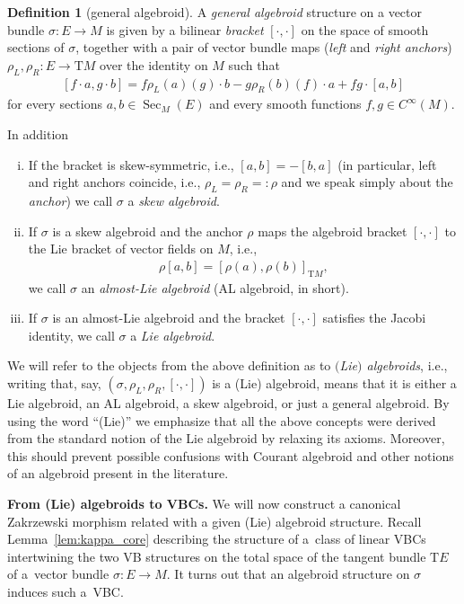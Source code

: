 \documentclass[10pt,a4paper]{amsart}
\newcommand{\ZM}{{VBC}} %
\newcommand{\Sec}{\operatorname{Sec}}
\newcommand{\ra}{\rightarrow}
\newcommand{\rhoL}{\rho_L} %
\newcommand{\rhoR}{\rho_R}
\newcommand{\T}{\mathrm{T}} %
\numberwithin{equation}{section}
\theoremstyle{definition}
\newtheorem{df}[thm]{Definition}
\begin{document}
\begin{df}[general algebroid]\label{def:algebroid}
A \emph{general algebroid} structure on a vector bundle \mbox{$\sigma\colon E\!\ra\! M$} is given by a bilinear \emph{bracket} $[\cdot,\cdot]$ on the space of smooth sections of $\sigma$, together with a pair of vector bundle maps (\emph{left} and \emph{right anchors}) $\rhoL,\rhoR\colon E\ra \T M$ over the identity on $M$ such that
\begin{gather}\label{eqn:bracket}
[f\cdot a,g\cdot b]=f\rhoL(a)(g)\cdot b-g\rhoR(b)(f)\cdot a+fg\cdot[a,b]
\end{gather}
for every sections $a,b\in\Sec_M(E)$ and every smooth functions $f,g\in C^\infty(M)$.

In addition
\begin{enumerate}[(i)]\itemsep=0pt
\item\label{cond:skew} If the bracket is skew-symmetric, i.e., $[a,b]=-[b,a]$ (in particular, left and right anchors coincide, i.e., $\rhoL=\rhoR=:\rho$ and we speak simply about the \emph{anchor}) we call $\sigma$ a \emph{skew algebroid}.
\item\label{cond:al} If $\sigma$ is a skew algebroid and the anchor $\rho$ maps the algebroid bracket $[\cdot,\cdot]$ to the Lie bracket of vector fields on $M$, i.e.,
\begin{gather}
\label{eqn:al_algebroid}
\rho[a,b]=[\rho(a),\rho(b)]_{\T M} ,
\end{gather}
we call $\sigma$ an \emph{almost-Lie algebroid} (AL algebroid, in short).
\item\label{cond:lie} If $\sigma$ is an almost-Lie algebroid and the bracket $[\cdot,\cdot]$ satisfies the Jacobi identity, we call $\sigma$ a \emph{Lie algebroid}.
\end{enumerate}
\end{df}

 We will refer to the objects from the above definition as to \emph{$($Lie$)$ algebroids}, i.e., writing that, say, $(\sigma,\rhoL,\rhoR,[\cdot,\cdot])$ is a (Lie) algebroid, means that it is either a Lie algebroid, an AL algebroid, a skew algebroid, or just a general algebroid. By using the word ``(Lie)'' we emphasize that all the above concepts were derived from the standard notion of the Lie algebroid by relaxing its axioms. Moreover, this should prevent possible confusions with Courant algebroid and other notions of an algebroid present in the literature.

{\bf From (Lie) algebroids to \ZM s.} We will now construct a canonical Zakrzewski morphism related with a given (Lie) algebroid structure. Recall Lemma~\ref{lem:kappa_core} describing the structure of a~class of linear \ZM s intertwining the two VB structures on the total space of the tangent bundle $\T E$ of a~vector bundle $\sigma\colon E\ra M$. It turns out that an algebroid structure on $\sigma$ induces such a~\ZM .
\end{document}
